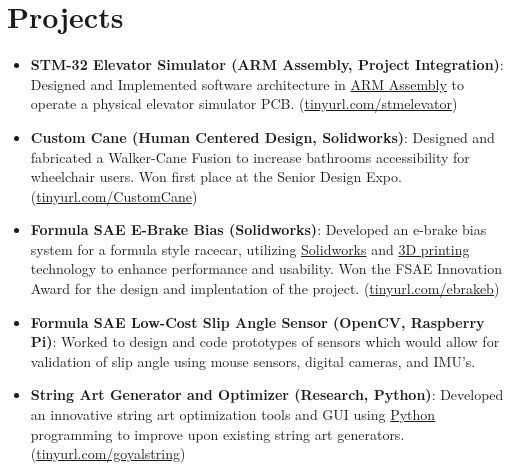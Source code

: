 \documentclass[letterpaper,10pt]{article}
\newcommand{\resumeItem}[2]{
  \item\small{
    \textbf{#1}{: #2 \vspace{-2pt}}
  }
}
\newcommand{\resumeSubItem}[2]{\resumeItem{#1}{#2}\vspace{-3pt}}
\newcommand{\resumeSubHeadingListStart}{\begin{itemize}[leftmargin=*]}
\newcommand{\resumeSubHeadingListEnd}{\end{itemize}}
\newcommand{\myLink}[1]{(\href{https://#1}{#1})}
\begin{document}
\section{Projects}
  \resumeSubHeadingListStart
    \resumeSubItem{STM-32 Elevator Simulator (ARM Assembly, Project Integration)}
    {Designed and Implemented software architecture in \underline{ARM Assembly} to operate a physical elevator simulator PCB. \myLink{tinyurl.com/stmelevator}}
\vspace{3pt}
    \resumeSubItem{Custom Cane (Human Centered Design, Solidworks)}
    {Designed and fabricated a Walker-Cane Fusion to increase bathrooms accessibility for wheelchair users. Won first place at the Senior Design Expo. \myLink{tinyurl.com/CustomCane}}
\vspace{3pt}
    \resumeSubItem{Formula SAE E-Brake Bias (Solidworks)}
    {Developed an e-brake bias system for a formula style racecar, utilizing \underline{Solidworks} and \underline{3D printing} technology to enhance performance and usability. Won the FSAE Innovation Award for the design and implentation of the project. \myLink{tinyurl.com/ebrakeb}}
\vspace{3pt}
    \resumeSubItem{Formula SAE Low-Cost Slip Angle Sensor (OpenCV, Raspberry Pi)}
    {Worked to design and code prototypes of sensors which would allow for validation of slip angle using mouse sensors, digital cameras, and IMU's.}
\vspace{3pt}
    \resumeSubItem{String Art Generator and Optimizer (Research, Python)}
    {Developed an innovative string art optimization tools and GUI using \underline{Python} programming to improve upon existing string art generators. \myLink{tinyurl.com/goyalstring}}
  \resumeSubHeadingListEnd
\vspace{-2pt}

\end{document}
